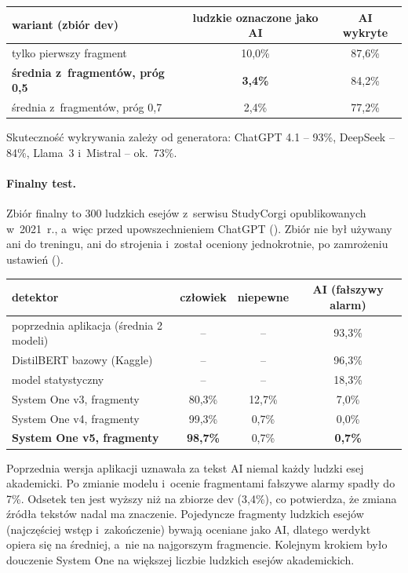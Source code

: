 \begin{center}
\begin{tabular}{|l|c|c|}
\hline
wariant (zbiór dev) & ludzkie oznaczone jako AI & AI wykryte \\
\hline
tylko pierwszy fragment & 10,0\% & 87,6\% \\
\textbf{średnia z~fragmentów, próg 0,5} & \textbf{3,4\%} & 84,2\% \\
średnia z~fragmentów, próg 0,7 & 2,4\% & 77,2\% \\
\hline
\end{tabular}
\end{center}

Skuteczność wykrywania zależy od generatora: ChatGPT 4.1 -- 93\%, DeepSeek --
84\%, Llama~3 i~Mistral -- ok.\ 73\%.

\paragraph{Finalny test.}
Zbiór finalny to 300 ludzkich esejów z~serwisu StudyCorgi opublikowanych
w~2021~r., a~więc przed upowszechnieniem ChatGPT ().
Zbiór nie był używany ani do treningu, ani do strojenia i~został oceniony
jednokrotnie, po zamrożeniu ustawień ().

\begin{center}
\small
\begin{tabular}{|l|c|c|c|}
\hline
detektor & człowiek & niepewne & AI (fałszywy alarm) \\
\hline
poprzednia aplikacja (średnia 2 modeli) & -- & -- & 93,3\% \\
DistilBERT bazowy (Kaggle) & -- & -- & 96,3\% \\
model statystyczny & -- & -- & 18,3\% \\
System One v3, fragmenty & 80,3\% & 12,7\% & 7,0\% \\
System One v4, fragmenty & 99,3\% & 0,7\% & 0,0\% \\
\textbf{System One v5, fragmenty} & \textbf{98,7\%} & 0,7\% & \textbf{0,7\%} \\
\hline
\end{tabular}
\end{center}

Poprzednia wersja aplikacji uznawała za tekst AI niemal każdy ludzki esej
akademicki. Po zmianie modelu i~ocenie fragmentami fałszywe alarmy spadły do
7\%. Odsetek ten jest wyższy niż na zbiorze dev (3,4\%), co potwierdza, że
zmiana źródła tekstów nadal ma znaczenie. Pojedyncze fragmenty ludzkich esejów
(najczęściej wstęp i~zakończenie) bywają oceniane jako AI, dlatego werdykt
opiera się na średniej, a~nie na najgorszym fragmencie. Kolejnym krokiem było
douczenie System One na większej liczbie ludzkich esejów akademickich.

